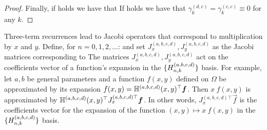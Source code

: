 \begin{proof}
Finally, if  holds we have that 
If  holds we have that $\gamma^{(d,c)}_{k} = \gamma^{(c,c)}_{k} \equiv 0$ for any $k$.

\end{proof}

Three-term recurrences lead to Jacobi operators that correspond to multiplication by $x$ and $y$. Define, for $n=0,1,2,\dots$: 
and set $J_x^{(a,b,c,d)}, J_y^{(a,b,c,d)}$ as the Jacobi matrices corresponding to
The matrices $J_x^{(a,b,c,d)}, J_y^{(a,b,c,d)}$ act on the coefficients vector of a function's expansion in the $\{H_{n,k}^{(a,b,c,d)}\}$ basis. For example, let $a, b$ be general parameters and a function $f(x,y)$ defined on $\Omega$ be approximated by its expansion $f(x,y) = \mathbb{H}^{(a,b,c,d)}(x,y)^\top \bm{f}$. Then $x \: f(x,y)$ is approximated by $\mathbb{H}^{(a,b,c,d)}(x,y)^\top {J_x^{(a,b,c,d)\top}} \bm{f}$. In other words, ${J_x^{(a,b,c,d)\top}} \vec{f}$ is the coefficients vector for the expansion of the function $(x,y) \mapsto x \: f(x,y)$ in the $\{H_{n,k}^{(a,b,c,d)}\}$ basis. 

